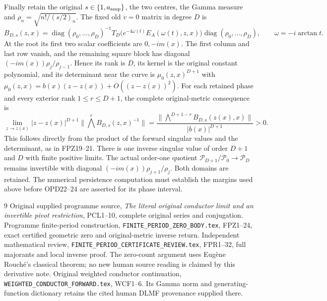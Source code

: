 \documentclass[11pt]{article}
\newcommand{\diag}{\operatorname{diag}}
\begin{document}
Finally retain the original $s\in\{1,a_{\rm amp}\}$, the two
centres, the Gamma measure and $\rho_n=\sqrt{n!/(s/2)_n}$.
The fixed old $v=0$ matrix in degree $D$ is
\[
 B_{D,s}(z,x)=\diag(\rho_0,\ldots,\rho_D)^{-1}
 T_D\bigl(e^{-4\omega(t)}E_A(\omega(t),z,x)\bigr)
 \diag(\rho_0,\ldots,\rho_D),\qquad\omega=-i\arctan t.
 \tag{OPD23}
\]
At the root its first two scalar coefficients are $0,-im(x)$.
The first column and last row vanish, and the remaining square
block has diagonal $(-im(x))\rho_j/\rho_{j-1}$.
Hence its rank is $D$, its kernel is the original constant
polynomial, and its determinant near the curve is
$\mu_0(z,x)^{D+1}$ with
$\mu_0(z,x)=b(x)(z-z(x))+O((z-z(x))^2)$.
For each retained phase and every exterior rank $1\le r\le D+1$,
the complete original-metric consequence is
\[
 \lim_{z\to z(x)}|z-z(x)|^{D+1}
   \|\bigwedge^r B_{D,s}(z,x)^{-1}\|
 =\frac{\|\bigwedge^{D+1-r}B_{D,s}(z(x),x)\|}
        {|b(x)|^{D+1}}>0.
 \tag{OPD24}
\]
This follows directly from the product of the forward singular
values and the determinant, as in FPZ19--21. There is one inverse
singular value of order $D+1$ and $D$ with finite positive limits.
The actual order-one quotient
$\mathcal P_{D+1}/\mathcal P_0\to\mathcal P_D$ remains invertible
with diagonal $(-im(x))\rho_{j+1}/\rho_j$. Both domains are retained.
The numerical persistence computation must establish the margins
used above before OPD22--24 are asserted for its phase interval.

\begin{thebibliography}{9}
 Original supplied programme source,
\emph{The literal original conductor limit and an invertible pivot
restriction}, PCL1--10, complete original series and conjugation.
 Programme finite-period construction,
\texttt{FINITE\_PERIOD\_ZERO\_BODY.tex}, FPZ1--24, exact certified
geometric zero and original-metric inverse return.
 Independent mathematical review,
\texttt{FINITE\_PERIOD\_CERTIFICATE\_REVIEW.tex}, FPR1--32,
full majorants and local inverse proof. The zero-count argument
uses Eug\`ene Rouch\'e's classical theorem; no new human source
reading is claimed by this derivative note.
 Original weighted conductor continuation,
\texttt{WEIGHTED\_CONDUCTOR\_FORWARD.tex}, WCF1--6. Its Gamma
norm and generating-function dictionary retains the cited human
DLMF provenance supplied there.
\end{thebibliography}
\end{document}
